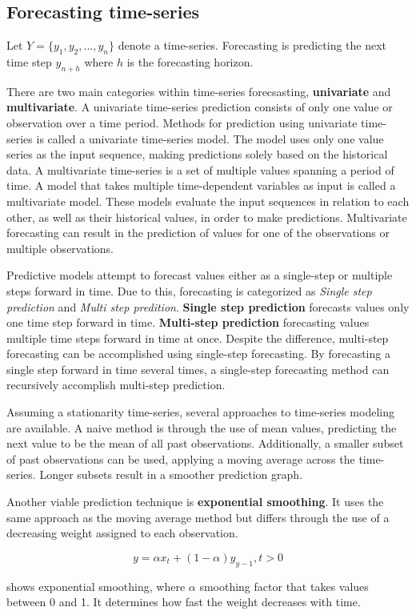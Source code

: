 
\subsection{Forecasting time-series}
\label{section:BT:forecasting-time-series}
Let  $Y = \{y_1, y_2, ..., y_n\}$ denote a time-series.
Forecasting is predicting the next time step $y_{n+h}$ where $h$ is the forecasting horizon.

There are two main categories within time-series forecsasting, \textbf{univariate} and \textbf{multivariate}.
A univariate time-series prediction consists of only one value or observation over a time period.
Methods for prediction using univariate time-series is called a univariate time-series model.
The model uses only one value series as the input sequence, making predictions solely based on the historical data.
A multivariate time-series is a set of multiple values spanning a period of time.
A model that takes multiple time-dependent variables as input is called a multivariate model.
These models evaluate the input sequences in relation to each other, as well as their historical values, in order to make predictions.
Multivariate forecasting can result in the prediction of values for one of the observations or multiple observations.

Predictive models attempt to forecast values either as a single-step or multiple steps forward in time.
Due to this, forecasting is categorized as \textit{Single step prediction} and \textit{Multi step predition}.
\textbf{Single step prediction} forecasts values only one time step forward in time.
\textbf{Multi-step prediction} forecasting values multiple time steps forward in time at once.
Despite the difference, multi-step forecasting can be accomplished using single-step forecasting.
By forecasting a single step forward in time several times, a single-step forecasting method can recursively accomplish multi-step prediction.


Assuming a stationarity time-series, several approaches to time-series modeling are available.
A naive method is through the use of mean values, predicting the next value to be the mean of all past observations.
Additionally, a smaller subset of past observations can be used, applying a moving average across the time-series.
Longer subsets result in a smoother prediction graph.

Another viable prediction technique is \textbf{exponential smoothing}.
It uses the same approach as the moving average method but differs through the use of
a decreasing weight assigned to each observation.

\begin{equation}
  \label{eq:exponential_smoothing}
  y = \alpha x_t + (1 - \alpha)y_{y-1}, t > 0
\end{equation}

shows exponential smoothing, where $\alpha$ smoothing factor
that takes values between 0 and 1. It determines how fast the weight decreases with time.



